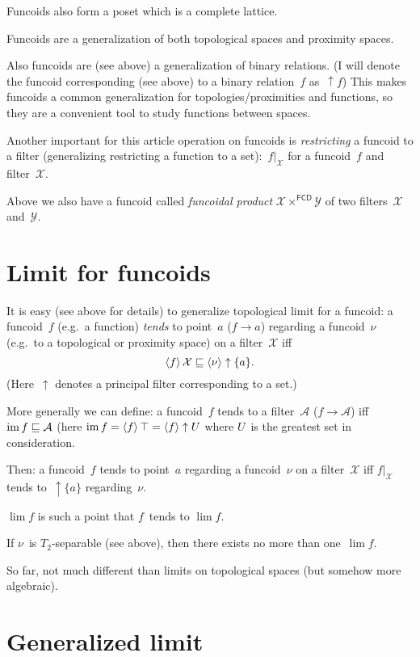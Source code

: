 Funcoids also form a poset which is a complete lattice.

Funcoids are a generalization of both topological spaces and proximity spaces.

Also funcoids are (see above) a generalization of binary relations. (I will denote the funcoid corresponding (see above) to a binary relation~$f$ as~$\uparrow f$) This makes funcoids a common generalization for topologies/proximities and functions, so they are a convenient tool to study functions between spaces.

Another important for this article operation on funcoids is \emph{restricting} a funcoid to a filter (generalizing restricting a function to a set):~$f|_{\mathcal{X}}$ for a funcoid~$f$ and filter~$\mathcal{X}$.

Above we also have a funcoid called \emph{funcoidal product} $\mathcal{X}\times^{\mathsf{FCD}}\mathcal{Y}$ of two filters~$\mathcal{X}$ and~$\mathcal{Y}$.

\chapter{Limit for funcoids}

It is easy (see above for details) to generalize topological limit for a funcoid: a funcoid~$f$ (e.g.\ a function) \emph{tends} to point~$a$ ($f\to a$) regarding a funcoid~$\nu$ (e.g.\ to a topological or proximity space) on a filter~$\mathcal{X}$ iff
\[ \left\langle f\right\rangle\mathcal{X} \sqsubseteq \left\langle \nu\right\rangle\uparrow\{a\}. \]
(Here~$\uparrow$ denotes a principal filter corresponding to a set.)

More generally we can define: a funcoid~$f$ tends to a filter~$\mathcal{A}$ ($f\to\mathcal{A}$) iff $\operatorname{im} f\sqsubseteq\mathcal{A}$ (here $\operatorname{im} f = \left\langle f\right\rangle\top = \left\langle f\right\rangle\uparrow U$ where $U$~is the greatest set in consideration.

Then: a funcoid~$f$ tends to point~$a$ regarding a funcoid~$\nu$ on a filter~$\mathcal{X}$ iff $f|_{\mathcal{X}}$ tends to~$\uparrow\{a\}$ regarding~$\nu$.

$\lim f$ is such a point that $f$~tends to $\lim f$.

If $\nu$~is $T_2$-separable (see above), then there exists no more than one~$\lim f$.

So far, not much different than limits on topological spaces (but somehow more algebraic).

\chapter{Generalized limit}

